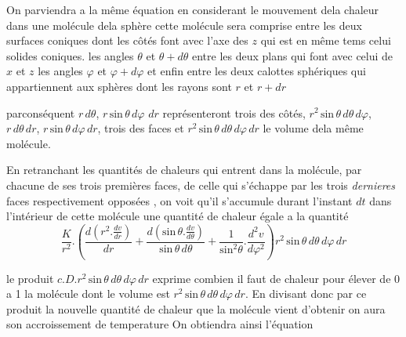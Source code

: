 \documentclass[11pt,a4paper]{article}
\begin{document}
On parviendra a la même équation en considerant le mouvement
dela chaleur dans une molécule dela sphère cette molécule
sera comprise entre les deux surfaces coniques dont les côtés
font avec l'axe des $z$ qui est en même tems celui 
 solides coniques. les angles $\theta$ et $\theta + d\theta$ entre les deux
plans qui font avec celui de $x$ et $z$ les angles $\varphi$ et $\varphi + d\varphi$
et enfin entre les deux calottes sphériques qui appartiennent
aux sphères dont les rayons sont $r$ et $r + dr$

parconséquent  $r\,d\theta$, $r\,\text{sin}\,\theta\,d\varphi$ \ill{} $dr$  représenteront trois
des côtés, $r^{2}\,\text{sin}\,\theta\,d\theta\,d\varphi$,  $r\,d\theta\,dr$, \struck{\ill{}} $r\,\text{sin}\,\theta\,d\varphi\,dr$,
trois des faces et $r^{2}\,\text{sin}\,\theta\,d\theta\,d\varphi\,dr$ le volume dela même
molécule.

En retranchant les quantités de chaleurs qui entrent dans
la molécule, par chacune de ses trois premières faces, de celle qui s'échappe par les trois
\emph{dernieres} faces respectivement opposées , on voit qu'il s'accumule
durant l'instant $dt$ dans l'intérieur de cette molécule une
quantité de chaleur égale a la quantité
\[ \frac{K}{r^{2}}.\left(\frac{d\left(r^{2}.\frac{dv}{dr}\right)}{dr} + \frac{d\left(\text{sin}\,\theta.\frac{dv}{d\theta}\right)}{\text{sin}\,\theta\,d\theta} + \frac{1}{\text{sin}^{2}\theta}.\frac{d^{2}v}{d\varphi^{2}}\right)r^{2}\,\text{sin}\,\theta\,d\theta\,d\varphi\,dr \]

le produit $c.D.r^{2}\,\text{sin}\,\theta\,d\theta\,d\varphi\,dr$ exprime combien il faut de
chaleur pour élever de 0 a 1 la molécule dont le
volume est $r^{2}\,\text{sin}\,\theta\,d\theta\,d\varphi\,dr$. En divisant donc par
ce produit la nouvelle quantité de chaleur que la molécule
vient d'obtenir on aura son accroissement de temperature
On obtiendra ainsi l'équation
\end{document}
